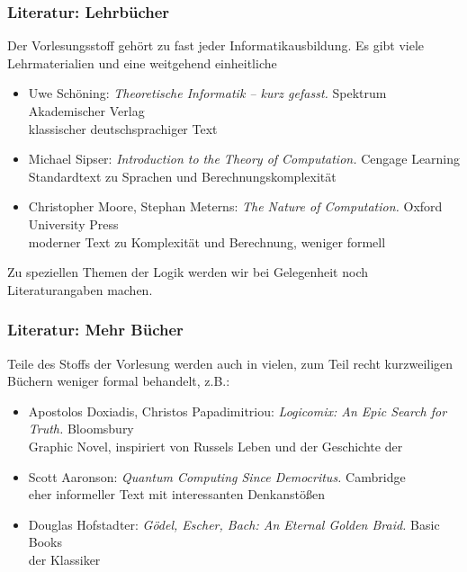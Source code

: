 \documentclass[onlymath]{beamer}
\begin{document}

\begin{frame}\frametitle{Literatur: Lehrbücher}

Der Vorlesungsstoff gehört zu fast jeder Informatikausbildung. Es gibt viele
Lehrmaterialien und eine weitgehend einheitliche 
\bigskip

\begin{itemize}
\item Uwe Schöning: \emph{Theoretische Informatik -- kurz gefasst.} Spektrum Akademischer Verlag\\
{\footnotesize\textcolor{devilscss}{klassischer deutschsprachiger Text}}
%
\item Michael Sipser: \emph{Introduction to the Theory of Computation.}  Cengage Learning\\
{\footnotesize\textcolor{devilscss}{Standardtext zu Sprachen und Berechnungskomplexität}}
%
\item Christopher Moore, Stephan Meterns: \emph{The Nature of Computation.} Oxford University Press\\
{\footnotesize\textcolor{devilscss}{moderner Text zu Komplexität und Berechnung, weniger formell}}
\end{itemize}

Zu speziellen Themen der Logik werden wir bei Gelegenheit noch Literaturangaben machen.

\end{frame}

\begin{frame}\frametitle{Literatur: Mehr Bücher}

Teile des Stoffs der Vorlesung werden auch in vielen, zum Teil recht kurzweiligen 
Büchern weniger formal behandelt, z.B.:
\bigskip

\begin{itemize}
\item Apostolos Doxiadis, Christos Papadimitriou: \emph{Logicomix: An Epic Search for Truth.} Bloomsbury\\
{\footnotesize\textcolor{devilscss}{Graphic Novel, inspiriert von Russels Leben und der Geschichte der }}
% 
\item Scott Aaronson: \emph{Quantum Computing Since Democritus.} Cambridge\\
{\footnotesize\textcolor{devilscss}{eher informeller Text mit interessanten Denkanstößen}}
%
\item Douglas Hofstadter: \emph{Gödel, Escher, Bach: An Eternal Golden Braid.} Basic Books\\
{\footnotesize\textcolor{devilscss}{der Klassiker}}
\end{itemize}

\end{frame}
\end{document}
